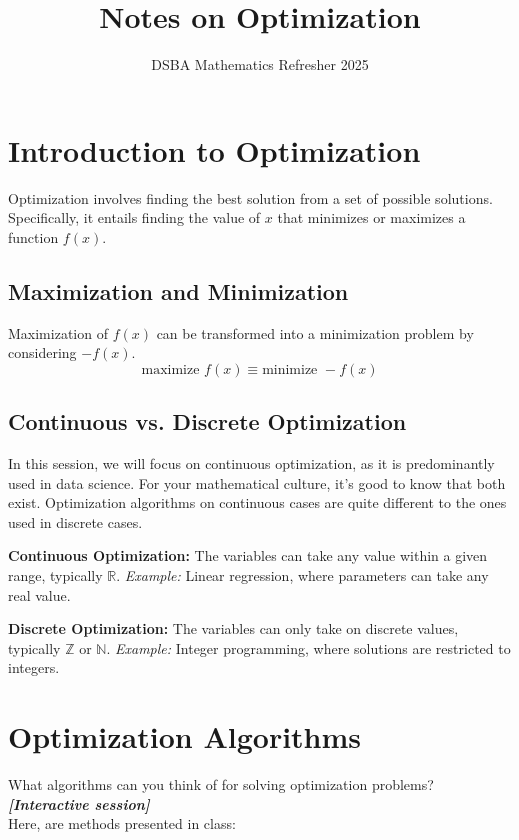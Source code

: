 \documentclass[]{article}
\title{Notes on Optimization}
\author{DSBA Mathematics Refresher 2025}
\date{}
\newcommand{\N}{\mathbb{N}}
\newcommand{\Z}{\mathbb{Z}}
\newcommand{\R}{\mathbb{R}}
\begin{document}
	
	\maketitle
	
	\begin{abstract}
		
	\end{abstract}
	
	\section*{Introduction to Optimization}
	Optimization involves finding the best solution from a set of possible solutions.
	Specifically, it entails finding the value of $x$ that minimizes or maximizes a function $f(x)$.
	
	\subsection*{Maximization and Minimization}
	Maximization of $f(x)$ can be transformed into a minimization problem by considering $-f(x)$.
	$$\text{maximize } f(x) \equiv \text{minimize } -f(x)$$
	
	\subsection*{Continuous vs. Discrete Optimization}
	In this session, we will focus on continuous optimization, as it is predominantly used in data science.
	For your mathematical culture, it's good to know that both exist.
	Optimization algorithms on continuous cases are quite different to the ones used in discrete cases.
	
	\textbf{Continuous Optimization:}
	The variables can take any value within a given range, typically $\R$.
	\textit{Example:} Linear regression, where parameters can take any real value.
	
	\textbf{Discrete Optimization:}
	The variables can only take on discrete values, typically $\Z$ or $\N$.
	\textit{Example:} Integer programming, where solutions are restricted to integers.
	
	\section*{Optimization Algorithms}
	What algorithms can you think of for solving optimization problems?\\
	\textbf{\textit{[Interactive session]}}\\
	Here, are methods presented in class:
	
\end{document}
